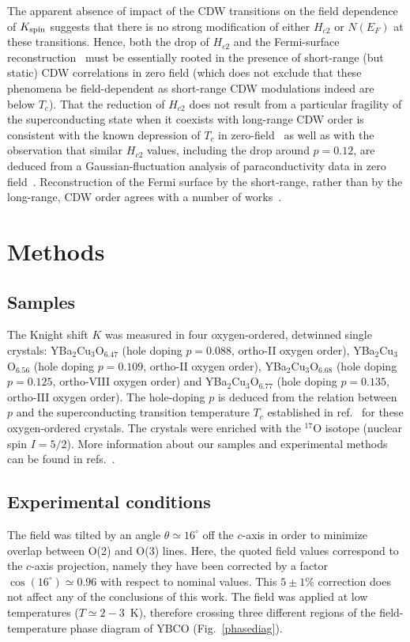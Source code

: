 \documentclass[superscriptaddress,twocolumn,prl,preprintnumbers,amsmath,amssymb]{revtex4}
\begin{document}
The apparent absence of impact of the CDW transitions on the field dependence of $K_{\rm spin}$ suggests that there is no strong modification of either $H_{c2}$ or $N(E_F)$ at these transitions. Hence, both the drop of $H_{c2}$ and the Fermi-surface reconstruction~\cite{LeBoeuf07,Sebastian15} must be essentially rooted in the presence of short-range (but static) CDW correlations in zero field (which does not exclude that these phenomena be field-dependent as short-range CDW modulations indeed are below $T_c$). That the reduction of $H_{c2}$ does not result from a particular fragility of the superconducting state when it coexists with long-range CDW order is consistent with the known depression of $T_c$ in zero-field~\cite{Liang06} as well as with the observation that similar $H_{c2}$ values, including the drop around $p=0.12$, are deduced from a Gaussian-fluctuation analysis of paraconductivity data in zero field~\cite{Tafti14,Chang12b}. Reconstruction of the Fermi surface by the short-range, rather than by the long-range, CDW order agrees with a number of works~\cite{Chan16,recons1,recons2,recons3,recons4,recons5,recons6,recons7,recons8,Laliberte17}.



\section{Methods}
\subsection*{\bf Samples}
The Knight shift $K$ was measured in four oxygen-ordered, detwinned single crystals: YBa$_2$Cu$_3$O$_{6.47}$ (hole doping $p = 0.088$, ortho-II oxygen order), YBa$_2$Cu$_3$O$_{6.56}$ (hole doping $p = 0.109$, ortho-II oxygen order), YBa$_2$Cu$_3$O$_{6.68}$ (hole doping $p = 0.125$, ortho-VIII oxygen order) and YBa$_2$Cu$_3$O$_{6.77}$ (hole doping $p = 0.135$, ortho-III oxygen order). The hole-doping $p$ is deduced from the relation between $p$ and the superconducting transition temperature $T_c$ established in ref.~\cite{Liang06} for these oxygen-ordered crystals. The crystals were enriched with the $^{17}$O isotope (nuclear spin $I = 5/2$). More information about our samples and experimental methods can be found in refs.~\cite{Liang12,Wu16}.

\subsection*{\bf Experimental conditions}
The field was tilted by an angle $\theta\simeq 16^{\circ}$ off the $c$-axis in order to minimize overlap between O(2) and O(3) lines. Here, the quoted field values correspond to the $c$-axis projection, namely they have been corrected by a factor $\cos(16^{\circ})\simeq0.96$ with respect to nominal values. This $5\pm1$\% correction does not affect any of the conclusions of this work. The field was applied at low temperatures ($T \simeq 2-3$~K), therefore crossing three different regions of the field-temperature phase diagram of YBCO (Fig.~\ref{phasediag}).
\end{document}
